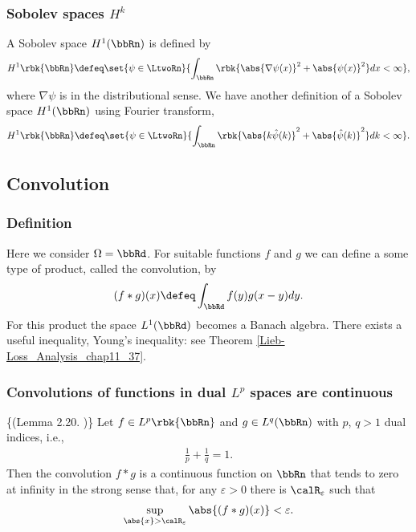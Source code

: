 \documentclass[openany, a4paper, oneside]{jsbook}
\begin{document}
\subsubsection{Sobolev spaces $H^k$}

A Sobolev space $H^1 (\bbRn)$ is defined by
\begin{align}
 H^1 \rbk{\bbRn}
 \defeq
 \set{\psi \in \LtwoRn}{\int_{\bbRn} \rbk{\abs{\nabla \psi (x)}^2 + \abs{\psi (x)}^2} dx < \infty},
\end{align}
where $\nabla \psi$ is in the distributional sense.
We have another definition of a Sobolev space $H^1 (\bbRn)$ using Fourier transform,
\begin{align}
 H^1 \rbk{\bbRn}
 \defeq
 \set{\psi \in \LtwoRn}{\int_{\bbRn} \rbk{\abs{k \hat{\psi} (k)}^2 + \abs{\hat{\psi} (k)}^2} d k < \infty}.
\end{align}
\subsection{Convolution}

\subsubsection{Definition}

Here we consider $\Omega = \bbRd$.
For suitable functions $f$ and $g$ we can define a some type of product, called the convolution, by
\begin{align}
 (f * g) (x)
 \defeq
 \int_{\bbRd} f (y) g (x - y) dy.
\end{align}
For this product the space $L^1 (\bbRd)$ becomes a Banach algebra.
There exists a useful inequality, Young's inequality: see Theorem \ref{Lieb-Loss_Analysis_chap11_37}.
\subsubsection{Convolutions of functions in dual $L^p$ spaces are continuous}

\begin{lem}\textup\{(Lemma 2.20. \cite{LiebLoss1})\}\label{Lieb-Loss_Analysis_chap11_41}
 Let $f \in L^p \rbk{\bbRn}$ and $g \in L^q (\bbRn)$ with $p$, $q > 1$ dual indices, i.e.,
\begin{align}
 \frac{1}{p} + \frac{1}{q} = 1.
\end{align}
Then the convolution $f*g$ is a continuous function on $\bbRn$ that tends to zero at infinity in the strong sense that,
for any $\varepsilon > 0$ there is $\calR_{\varepsilon}$ such that
\begin{align}
 \sup_{\abs{x} > \calR_{\varepsilon}} \abs{(f*g) (x)} < \varepsilon.
\end{align}
\end{lem}
\end{document}
